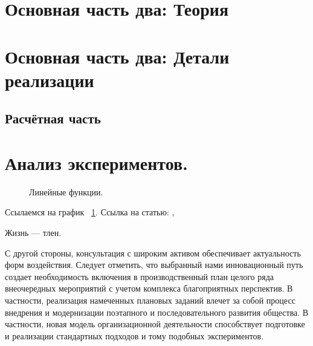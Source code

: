 \documentclass[a4paper,article,14pt]{extarticle}
\begin{document}
\pagebreak
\section{Основная часть два: Теория}

\section{Основная часть два: Детали реализации}
\subsection{Расчётная часть}

\section{Анализ экспериментов.}
\begin{figure}[ht]
\begin{center}

\caption{
\label{graph-fig}
     Линейные функции.}
\end {center}
\end {figure}
Ссылаемся на график ~\ref{graph-fig}.
Ссылка на статью: \cite{voc}, \cite{vo2}

Жизнь --- тлен.
\pagebreak


С другой стороны, консультация с широким активом обеспечивает актуальность форм воздействия. Следует отметить, что выбранный нами инновационный путь создает необходимость включения в производственный план целого ряда внеочередных мероприятий с учетом комплекса благоприятных перспектив. В частности, реализация намеченных плановых заданий влечет за собой процесс внедрения и модернизации поэтапного и последовательного развития общества. В частности, новая модель организационной деятельности способствует подготовке и реализации стандартных подходов и тому подобных экспериментов.
\end{document}
